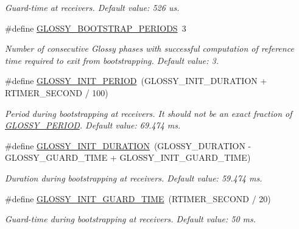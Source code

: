 \begin{DoxyCompactItemize}
\begin{DoxyCompactList}\small\item\em Guard-\/time at receivers. Default value: 526 us. \end{DoxyCompactList}\item 
\hypertarget{group__glossy-test-settings_ga8c2dcd42a2c913f0f80525a7c2eac3f1}{
\#define \hyperlink{group__glossy-test-settings_ga8c2dcd42a2c913f0f80525a7c2eac3f1}{GLOSSY\_\-BOOTSTRAP\_\-PERIODS}~3}
\label{group__glossy-test-settings_ga8c2dcd42a2c913f0f80525a7c2eac3f1}

\begin{DoxyCompactList}\small\item\em Number of consecutive Glossy phases with successful computation of reference time required to exit from bootstrapping. Default value: 3. \end{DoxyCompactList}\item 
\hypertarget{group__glossy-test-settings_ga21f18e3204161cd2b12f9979a28376f2}{
\#define \hyperlink{group__glossy-test-settings_ga21f18e3204161cd2b12f9979a28376f2}{GLOSSY\_\-INIT\_\-PERIOD}~(GLOSSY\_\-INIT\_\-DURATION + RTIMER\_\-SECOND / 100)}
\label{group__glossy-test-settings_ga21f18e3204161cd2b12f9979a28376f2}

\begin{DoxyCompactList}\small\item\em Period during bootstrapping at receivers. It should not be an exact fraction of \hyperlink{group__glossy-test-settings_ga6f68058577fdbfccbd8e50537609a5e4}{GLOSSY\_\-PERIOD}. Default value: 69.474 ms. \end{DoxyCompactList}\item 
\hypertarget{group__glossy-test-settings_gaa096b07a5e769ee16ce1e872b8fa9e96}{
\#define \hyperlink{group__glossy-test-settings_gaa096b07a5e769ee16ce1e872b8fa9e96}{GLOSSY\_\-INIT\_\-DURATION}~(GLOSSY\_\-DURATION -\/ GLOSSY\_\-GUARD\_\-TIME + GLOSSY\_\-INIT\_\-GUARD\_\-TIME)}
\label{group__glossy-test-settings_gaa096b07a5e769ee16ce1e872b8fa9e96}

\begin{DoxyCompactList}\small\item\em Duration during bootstrapping at receivers. Default value: 59.474 ms. \end{DoxyCompactList}\item 
\hypertarget{group__glossy-test-settings_gab6849986e590b8cd21c92f20901433ee}{
\#define \hyperlink{group__glossy-test-settings_gab6849986e590b8cd21c92f20901433ee}{GLOSSY\_\-INIT\_\-GUARD\_\-TIME}~(RTIMER\_\-SECOND / 20)}
\label{group__glossy-test-settings_gab6849986e590b8cd21c92f20901433ee}

\begin{DoxyCompactList}\small\item\em Guard-\/time during bootstrapping at receivers. Default value: 50 ms. \end{DoxyCompactList}\end{DoxyCompactItemize}
